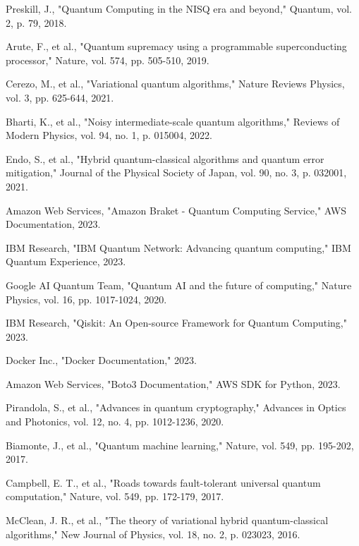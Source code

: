 \documentclass[onecolumn]{IEEEtran}
\begin{document}
\begin{thebibliography}{15}

Preskill, J., "Quantum Computing in the NISQ era and beyond," Quantum, vol. 2, p. 79, 2018.

Arute, F., et al., "Quantum supremacy using a programmable superconducting processor," Nature, vol. 574, pp. 505-510, 2019.

Cerezo, M., et al., "Variational quantum algorithms," Nature Reviews Physics, vol. 3, pp. 625-644, 2021.

Bharti, K., et al., "Noisy intermediate-scale quantum algorithms," Reviews of Modern Physics, vol. 94, no. 1, p. 015004, 2022.

Endo, S., et al., "Hybrid quantum-classical algorithms and quantum error mitigation," Journal of the Physical Society of Japan, vol. 90, no. 3, p. 032001, 2021.

Amazon Web Services, "Amazon Braket - Quantum Computing Service," AWS Documentation, 2023.

IBM Research, "IBM Quantum Network: Advancing quantum computing," IBM Quantum Experience, 2023.

Google AI Quantum Team, "Quantum AI and the future of computing," Nature Physics, vol. 16, pp. 1017-1024, 2020.

IBM Research, "Qiskit: An Open-source Framework for Quantum Computing," 2023.

Docker Inc., "Docker Documentation," 2023.

Amazon Web Services, "Boto3 Documentation," AWS SDK for Python, 2023.

Pirandola, S., et al., "Advances in quantum cryptography," Advances in Optics and Photonics, vol. 12, no. 4, pp. 1012-1236, 2020.

Biamonte, J., et al., "Quantum machine learning," Nature, vol. 549, pp. 195-202, 2017.

Campbell, E. T., et al., "Roads towards fault-tolerant universal quantum computation," Nature, vol. 549, pp. 172-179, 2017.

McClean, J. R., et al., "The theory of variational hybrid quantum-classical algorithms," New Journal of Physics, vol. 18, no. 2, p. 023023, 2016.

\end{thebibliography}
\end{document}
